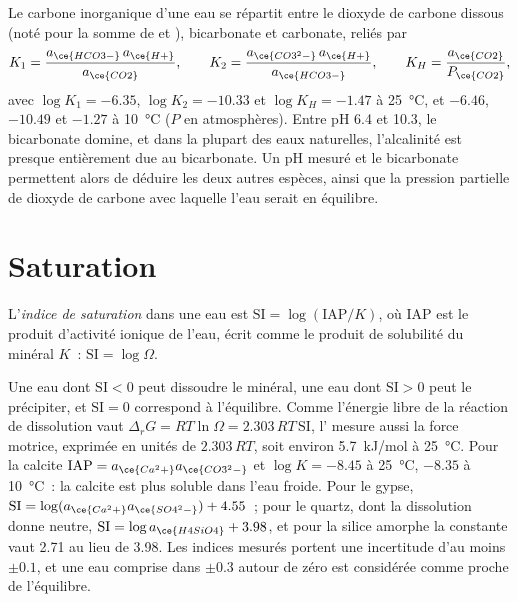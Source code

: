 Le carbone inorganique d'une eau se répartit entre le dioxyde de carbone dissous
(noté  pour la somme de  et ), bicarbonate et
carbonate, reliés par
\[
K_1 = \frac{a_{\ce{HCO3-}}\,a_{\ce{H+}}}{a_{\ce{CO2}}}, \qquad
K_2 = \frac{a_{\ce{CO3^2-}}\,a_{\ce{H+}}}{a_{\ce{HCO3-}}}, \qquad
K_H = \frac{a_{\ce{CO2}}}{P_{\ce{CO2}}},
\]
avec $\log K_1 = -6.35$, $\log K_2 = -10.33$ et $\log K_H = -1.47$ à
\qty{25}{\celsius}, et $-6.46$, $-10.49$ et $-1.27$ à \qty{10}{\celsius}
($P$ en atmosphères). Entre pH 6.4 et 10.3, le bicarbonate domine, et dans
la plupart des eaux naturelles, l'alcalinité est presque entièrement due au bicarbonate. Un pH
mesuré et le bicarbonate permettent alors de déduire les deux autres espèces, ainsi que la pression partielle de
dioxyde de carbone avec laquelle l'eau serait en équilibre.

\section{Saturation}\label{sec:b3:water-rock-interaction:saturation}

\begin{definition}\label{def:b3:water-rock-interaction:si}
L'\emph{indice de saturation}
dans une eau est $\mathrm{SI} = \log(\mathrm{IAP}/K)$, où IAP est
le produit d'activité ionique de l'eau, écrit comme le produit de solubilité
du minéral $K$~: $\mathrm{SI} = \log\Omega$.
\end{definition}

Une eau dont $\mathrm{SI} < 0$ peut dissoudre le minéral, une eau dont
$\mathrm{SI} > 0$ peut le précipiter, et $\mathrm{SI} = 0$ correspond à l'équilibre.
Comme l'énergie libre de la réaction de dissolution vaut $\Delta_r G = RT\ln\Omega
= 2.303\,RT\,\mathrm{SI}$, l' mesure aussi la
force motrice, exprimée en unités de $2.303\,RT$, soit environ \qty{5.7}{kJ/mol} à
\qty{25}{\celsius}. Pour la calcite $\mathrm{IAP} = a_{\ce{Ca^2+}}
a_{\ce{CO3^2-}}$ et $\log K = -8.45$ à \qty{25}{\celsius}, $-8.35$ à
\qty{10}{\celsius}~: la calcite est plus soluble dans l'eau froide. Pour le gypse, $\mathrm{SI} = \log(a_{\ce{Ca^2+}}a_{\ce{SO4^2-}}) + 4.55$~;
pour le quartz, dont la dissolution donne  neutre, $\mathrm{SI} = \log
a_{\ce{H4SiO4}} + 3.98$, et pour la silice amorphe la constante vaut 2.71
au lieu de 3.98. Les indices mesurés portent une incertitude d'au moins $\pm0.1$,
et une eau comprise dans $\pm0.3$ autour de zéro est considérée comme proche de l'équilibre.

